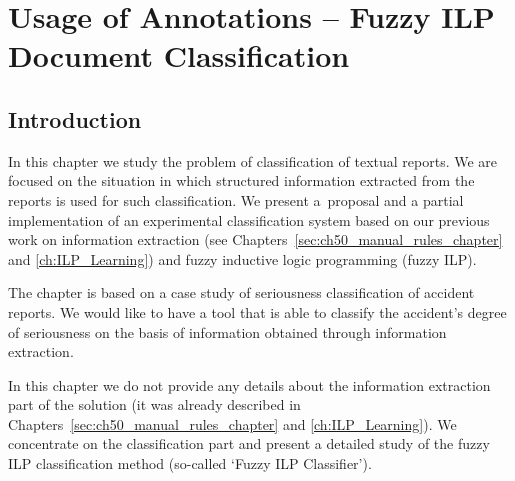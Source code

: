 \chapter{Usage of Annotations -- Fuzzy ILP Document Classification} \label{sec:ch80_fuzzy_ilp_chapter}

\graphicspath{{../img/ch80/}}


\section{Introduction}

In this chapter we study the problem of classification of textual reports. We are %
 focused on the situation in which structured information extracted from the reports is used for such classification. We present a~proposal and a partial implementation of an experimental classification system based on our previous work on information extraction (see Chapters~\ref{sec:ch50_manual_rules_chapter} and \ref{ch:ILP_Learning}) and fuzzy inductive logic programming (fuzzy ILP).


The chapter is based on a case study of seriousness classification of accident reports. 
We would like to have a tool that is able to classify the accident's degree of seriousness on the basis of information obtained through information extraction.


In this chapter we do not provide any details about the information extraction part of the solution (it was already described in Chapters~\ref{sec:ch50_manual_rules_chapter} and \ref{ch:ILP_Learning}). We concentrate on the classification part and present a detailed study of the fuzzy ILP classification method (so-called `Fuzzy ILP Classifier'). 


